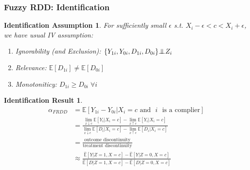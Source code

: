 \documentclass[xcolor=dvipsnames]{beamer}
\newtheorem{iass}{Identification Assumption}
\newtheorem{ires}{Identification Result}
\newcommand\E{\mathbb{E}}
\newcommand{\indep}{{\bot\negthickspace\negthickspace\bot}}
\begin{document}
\begin{frame}
  \frametitle{Fuzzy RDD: Identification}
 \begin{iass}
\footnotesize
For sufficiently small $\epsilon$ s.t. $X_i-\epsilon<c<X_i+\epsilon$, we have usual IV assumption:
\begin{enumerate}
\item<2-> Ignorability (and Exclusion):  $\{Y_{1i},Y_{0i},D_{1i},D_{0i} \} \indep Z_i $
\item<3-> Relevance: $\E[D_{1i}] \neq \E[D_{0i}]$
\item<4-> Monotoniticy: $D_{1i} \geq D_{0i} \; \forall i$
\end{enumerate}
\end{iass}
\begin{ires}
\footnotesize
\begin{align*}
 \alpha_{FRDD}  &= \E[Y_{1i}-Y_{0i} | X_i=c \mbox{ and }\, \,i\,\, \mbox{ is a complier} ] \\
  &=   \frac{\lim_{x\downarrow c}\E[Y_i|X_i=c]-\lim_{x\uparrow c}\E[Y_i|X_i=c]}{\lim_{x\downarrow c}\E[D_i|X_i=c]-\lim_{x\uparrow c}\E[D_i|X_i=c]} \\
  &= \frac{\mbox{outcome discontinuity}}{\mbox{treatment discontinuity}} \\
  &\approx \frac{\hat{\E}[Y|Z=1, X=c]-\hat{\E}[Y|Z=0, X=c]}{\hat{\E}[D|Z=1, X=c]-\hat{\E}[D|Z=0, X=c]}
\end{align*}
\end{ires}
\end{frame}

\end{document}
